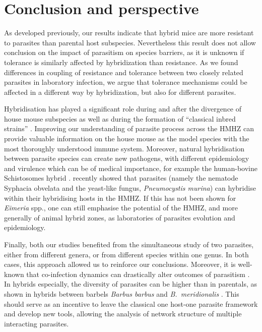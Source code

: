 \section{Conclusion and perspective}
As developed previously, our results indicate that hybrid mice are more resistant to parasites than parental host subspecies. Nevertheless this result does not allow conclusion on the impact of parasitism on species barriers, as it is unknown if tolerance is similarly affected by hybridization than resistance. As we found differences in coupling of resistance and tolerance between two closely related parasites in laboratory infection, we argue that tolerance mechanisms could be affected in a different way by hybridization, but also for different parasites.
\par
Hybridisation has played a significant role during and after the divergence of house mouse subspecies as well as during the formation of “classical inbred strains” \citep{yang_subspecific_2011}. Improving our understanding of parasite process across the HMHZ can provide valuable information on the house mouse as the model species with the most thoroughly understood immune system. Moreover, natural hybridisation between parasite species can create new pathogens, with different epidemiology and virulence \citep{arnold_natural_2004} which can be of medical importance, for example the human-bovine Schistosomes hybrid \citep{huyse_bidirectional_2009}. \cite{gouy_de_bellocq_holobiont_2018} recently showed that parasites (namely the nematode Syphacia obvelata and the yeast-like fungus, \textit{Pneumocystis murina}) can hybridise within their hybridising hosts in the HMHZ. If this has not been shown for \textit{Eimeria} spp., one can still emphasise the potential of the HMHZ, and more generally of animal hybrid zones, as laboratories of parasites evolution and epidemiology. 
\par
Finally, both our studies benefited from the simultaneous study of two parasites, either from different genera, or from different species within one genus. In both cases, this approach allowed us to reinforce our conclusions. Moreover, it is well-known that co-infection dynamics can drastically alter outcomes of parasitism \citep{brock_history_2014}. In hybrids especially, the diversity of parasites can be higher than in parentals, as shown in hybrids between barbels \textit{Barbus barbus} and \textit{B.~meridionalis} \citep{Gettov2016}. This should serve as an incentive to leave the classical one host-one parasite framework and develop new tools, allowing the analysis of network structure of multiple interacting parasites. 
